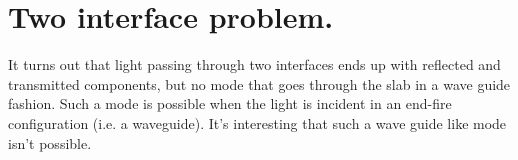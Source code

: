 %
%

\renewcommand{\basename}{emt10}
\renewcommand{\dirname}{notes/ece1228/}
\newcommand{\keywords}{ECE1228H}

%
\usepackage{peeters_braket}
\usepackage{peeters_figures}
\usepackage{mathtools}
\usepackage{siunitx}
\usepackage{macros_bm}
%
\beginArtNoToc
{}
\label{chap:emt10}
%
\section{Two interface problem.}
%
It turns out that light passing through two interfaces ends up with reflected and transmitted components, but no mode that goes through the slab in a wave guide fashion.  Such a mode is possible when the light is incident in an end-fire configuration (i.e. a waveguide).  It's interesting that such a wave guide like mode isn't possible.
%
